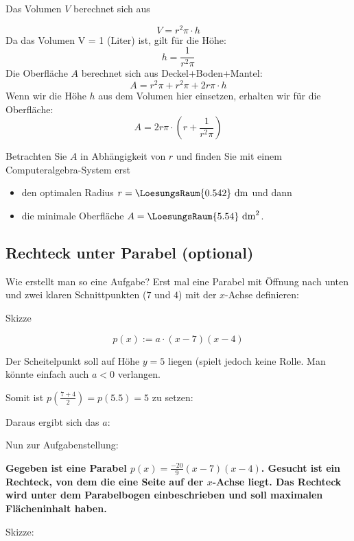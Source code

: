 Das Volumen $V$ berechnet sich aus

$$V = r^2\pi\cdot{}h$$
Da das Volumen V = 1 (Liter) ist, gilt für die Höhe:
$$h = \frac{1}{r^2\pi}$$
Die Oberfläche $A$ berechnet sich aus Deckel+Boden+Mantel:  
$$A=r^2\pi + r^2\pi + 2r\pi\cdot{}h$$
Wenn wir die Höhe $h$ aus dem Volumen hier einsetzen, erhalten wir für die Oberfläche:
$$A=2r\pi\cdot{}\left(r+\frac{1}{r^2\pi}\right)$$

Betrachten Sie $A$ in Abhängigkeit von $r$ und finden Sie mit einem
Computeralgebra-System erst
\begin{itemize}
\item
  den optimalen Radius $r=\LoesungsRaum{0.542} \text{ dm}$ und dann
\item
  die minimale Oberfläche $A= \LoesungsRaum{5.54} \text{ dm}^2$.
\end{itemize}
\newpage

\subsection{Rechteck unter Parabel (optional)}

Wie erstellt man so eine Aufgabe? Erst mal eine Parabel mit Öffnung nach unten und zwei klaren Schnittpunkten (\zB $7$ und $4$) mit der $x$-Achse definieren:

Skizze


$$p(x) := a\cdot{}(x-7)(x-4)$$

Der Scheitelpunkt soll auf Höhe $y=5$ liegen (spielt jedoch keine Rolle. Man könnte einfach auch $a<0$ verlangen.

Somit ist $p\left(\frac{7+4}2\right) = p(5.5) = 5$ zu setzen:



Daraus ergibt sich das $a$:

\newpage

Nun zur Aufgabenstellung:

\textbf{Gegeben ist eine Parabel $p(x) = \frac{-20}9(x-7)(x-4)$. Gesucht ist ein Rechteck, von dem die eine Seite auf der $x$-Achse liegt. Das Rechteck wird unter dem Parabelbogen einbeschrieben und soll maximalen Flächeninhalt haben.}

Skizze:


